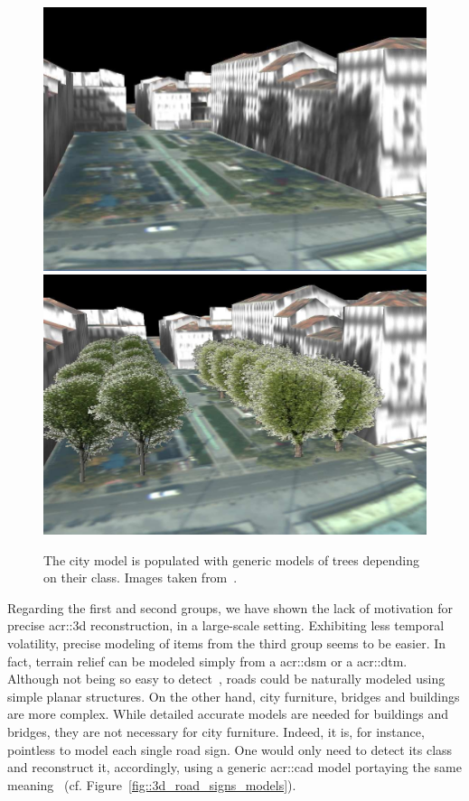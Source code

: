             \begin{figure}[htb]
                \centering
                \includegraphics[width=.45\textwidth]{images/introduction/modeling_trees_1}
                \qquad
                \includegraphics[width=.45\textwidth]{images/introduction/modeling_trees_2}
                \caption[
                    The city model is populated with generic models of trees depending on their class.
                ]{
                    \label{fig::3d_tree_models}
                    The city model is populated with generic models of trees depending on their class.
                    Images taken from~\parencite{iovan2008detection}.
                }
            \end{figure}
            Regarding the first and second groups, we have shown the lack of motivation for precise \gls{acr::3d} reconstruction, in a large-scale setting.
            Exhibiting less temporal volatility, precise modeling of items from the third group seems to be easier.
            In fact, terrain relief can be modeled simply from a \acrfull{acr::dsm} or a \gls{acr::dtm}.
            Although not being so easy to detect~\parencite{mnih2010learning}, roads could be naturally modeled using simple planar structures.
            On the other hand, city furniture, bridges and buildings are more complex.
            While detailed accurate models are needed for buildings and bridges, they are not necessary for city furniture.
            Indeed, it is, for instance, pointless to model each single road sign.
            One would only need to detect its class and reconstruct it, accordingly, using a generic \gls{acr::cad} model portaying the same meaning~\parencite{soheilian2013detection} (cf. Figure~\ref{fig::3d_road_signs_models}).\\
